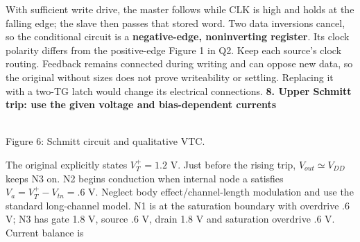 \documentclass[10pt]{article}
\newcommand{\mos}[4]{\begin{scope}[shift={(#1,#2)}]
\draw (0,.24)--(0,-.24);\draw (0,.20)--(.25,.20)--(.25,.5);
\draw (0,-.20)--(.25,-.20)--(.25,-.5);\draw (-.16,.23)--(-.16,-.23);
\ifnum#4=1\draw (-.26,0) circle (.06);\draw (-.75,0)--(-.32,0);\else\draw (-.75,0)--(-.16,0);\fi
\node[anchor=east,font=\scriptsize] at (-.76,0) {$#3$};\end{scope}}
\newcommand{\ground}[2]{\draw (#1,#2)--(#1,{#2-.12});\draw ({#1-.17},{#2-.12})--({#1+.17},{#2-.12});\draw ({#1-.11},{#2-.20})--({#1+.11},{#2-.20});}
\newcommand{\rail}[3]{\draw (#1,#2)--(#1,{#2+.14});\node[above,font=\scriptsize] at (#1,{#2+.14}) {$#3$};}
\newcommand{\hmos}[4]{\begin{scope}[shift={(#1,#2)}]
\draw(-.24,0)--(.24,0);\draw(-.2,0)--(-.2,-.25)--(-.5,-.25);\draw(.2,0)--(.2,-.25)--(.5,-.25);
\draw(-.23,.16)--(.23,.16);
\ifnum#4=1\draw(0,.26)circle(.06);\draw(0,.32)--(0,.75);\else\draw(0,.16)--(0,.75);\fi
\node[below,font=\scriptsize]at(0,-.32){#3};\end{scope}}
\begin{document}
With sufficient write drive, the master follows while CLK is high and holds at the falling edge; the slave then passes that stored word. Two data inversions cancel, so the conditional circuit is a \textbf{negative-edge, noninverting register}. Its clock polarity differs from the positive-edge Figure 1 in Q2. Keep each source's clock routing. Feedback remains connected during writing and can oppose new data, so the original without sizes does not prove writeability or settling. Replacing it with a two-TG latch would change its electrical connections.
\newpage
\textbf{8. Upper Schmitt trip: use the given voltage and bias-dependent currents}
\begin{center}\\Figure 6: Schmitt circuit and qualitative VTC.\end{center}
The original explicitly states $V_T^+=1.2$ V. Just before the rising trip, $V_{out}\simeq V_{DD}$ keeps N3 on. N2 begins conduction when internal node a satisfies $V_a=V_T^+-V_{tn}=.6$ V. Neglect body effect/channel-length modulation and use the standard long-channel model. N1 is at the saturation boundary with overdrive .6 V; N3 has gate 1.8 V, source .6 V, drain 1.8 V and saturation overdrive .6 V. Current balance is
\end{document}
